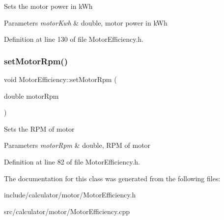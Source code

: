 Sets the motor power in k\+Wh 
\begin{DoxyParams}{Parameters}
{\em motor\+Kwh} & double, motor power in k\+Wh \\
\hline
\end{DoxyParams}


Definition at line 130 of file Motor\+Efficiency.\+h.

\mbox{\label{class_motor_efficiency_a2c4ddf9f2f3e44c098dad91a0ddbaf21}} 
\subsubsection{\texorpdfstring{set\+Motor\+Rpm()}{setMotorRpm()}}
{\footnotesize\ttfamily void Motor\+Efficiency\+::set\+Motor\+Rpm (\begin{DoxyParamCaption}\item[{double}]{motor\+Rpm }\end{DoxyParamCaption})\hspace{0.3cm}{\ttfamily [inline]}}

Sets the R\+PM of motor 
\begin{DoxyParams}{Parameters}
{\em motor\+Rpm} & double, R\+PM of motor \\
\hline
\end{DoxyParams}


Definition at line 82 of file Motor\+Efficiency.\+h.



The documentation for this class was generated from the following files\+:\begin{DoxyCompactItemize}
\item 
include/calculator/motor/Motor\+Efficiency.\+h\item 
src/calculator/motor/Motor\+Efficiency.\+cpp\end{DoxyCompactItemize}
